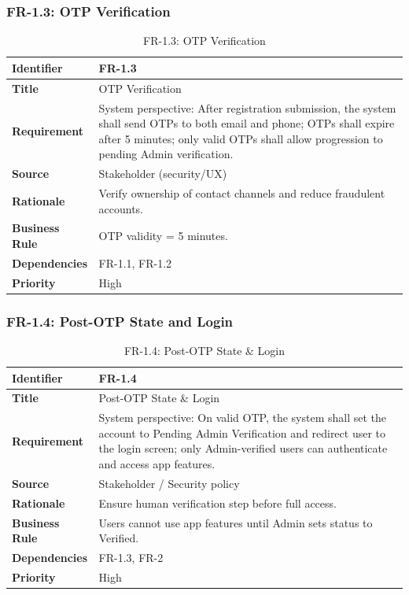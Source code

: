 \subsubsection{FR-1.3: OTP Verification}

\begin{longtable}{|p{3cm}|p{12cm}|}
\caption{FR-1.3: OTP Verification}
\label{tab:fr-1-3} \\
\hline
\rowcolor{lightgray!30}
\textbf{Identifier} & FR-1.3 \\
\hline
\textbf{Title} & OTP Verification \\
\hline
\textbf{Requirement} & System perspective: After registration submission, the system shall send OTPs to both email and phone; OTPs shall expire after 5 minutes; only valid OTPs shall allow progression to pending Admin verification. \\
\hline
\textbf{Source} & Stakeholder (security/UX) \\
\hline
\textbf{Rationale} & Verify ownership of contact channels and reduce fraudulent accounts. \\
\hline
\textbf{Business Rule} & OTP validity = 5 minutes. \\
\hline
\textbf{Dependencies} & FR-1.1, FR-1.2 \\
\hline
\textbf{Priority} & High \\
\hline
\end{longtable}

\subsubsection{FR-1.4: Post-OTP State and Login}

\begin{longtable}{|p{3cm}|p{12cm}|}
\caption{FR-1.4: Post-OTP State \& Login}
\label{tab:fr-1-4} \\
\hline
\rowcolor{lightgray!30}
\textbf{Identifier} & FR-1.4 \\
\hline
\textbf{Title} & Post-OTP State \& Login \\
\hline
\textbf{Requirement} & System perspective: On valid OTP, the system shall set the account to Pending Admin Verification and redirect user to the login screen; only Admin-verified users can authenticate and access app features. \\
\hline
\textbf{Source} & Stakeholder / Security policy \\
\hline
\textbf{Rationale} & Ensure human verification step before full access. \\
\hline
\textbf{Business Rule} & Users cannot use app features until Admin sets status to Verified. \\
\hline
\textbf{Dependencies} & FR-1.3, FR-2 \\
\hline
\textbf{Priority} & High \\
\hline
\end{longtable}

